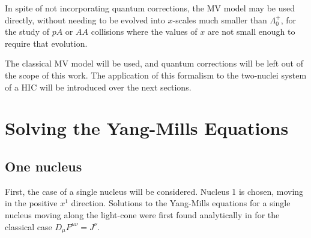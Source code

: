 In spite of not incorporating quantum corrections, the \gls{MV} model may be used directly, without needing to be evolved into $x$-scales much smaller than $\Lambda_0^+$, for the study of $pA$ or $AA$ collisions where the values of $x$ are not small enough to require that evolution. \citep{Gelis_2010} 













The classical \gls{MV} model will be used, and quantum corrections will be left out of the scope of this work. The application of this formalism to the two-nuclei system of a \gls{HIC} will be introduced over the next sections. 



\section{Solving the Yang-Mills Equations}
\label{sec:solving_YM}

\subsection{One nucleus}
First, the case of a single nucleus will be considered.  Nucleus 1 is chosen, moving in the positive $x^1$ direction.
Solutions to the Yang-Mills equations for a single nucleus moving along the light-cone were first found analytically in \cite{McLerran:1993ka} for the classical case $D_{\mu}F^{\mu \nu} = J^\nu$.   %

